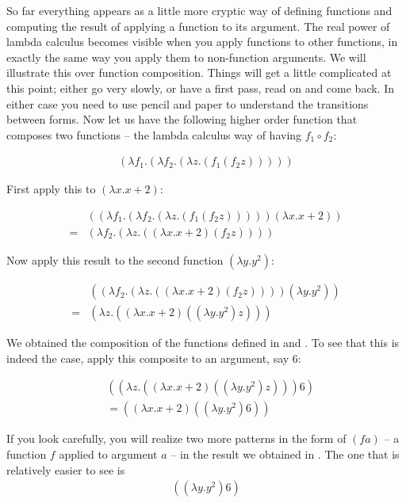 \documentclass[11pt]{article}
\begin{document}
So far everything appears as a little more cryptic way of defining functions and computing the result of applying a function to its argument. The real power of lambda calculus becomes visible when you apply functions to other functions, in exactly the same way you apply them to non-function arguments. We will illustrate this over function composition. Things will get a little complicated at this point; either go very slowly, or have a first pass, read on and come back. In either case you need to use pencil and paper to understand the transitions between forms.  Now let us have the following higher order function that composes two functions -- the lambda calculus way of having $f_1\circ f_2$:

\begin{align}
(\lambda f_1.(\lambda f_2.(\lambda z.(f_1(f_2z)))))
\end{align}

First apply this to $(\lambda x. x + 2)$:

\begin{align}
& ((\lambda f_1.(\lambda f_2.(\lambda z.(f_1(f_2z))))) (\lambda x. x +2))\\
=& (\lambda f_2.(\lambda z.((\lambda x. x +2)(f_2z)))) \nonumber
\end{align}

Now apply this result to the second function $(\lambda y. y^2)$:

\begin{align}
&  ((\lambda f_2.(\lambda z.((\lambda x. x +2)(f_2z))))(\lambda y. y^2)) \\
=& (\lambda z.((\lambda x. x+2)((\lambda y. y^2)z))) \nonumber
\end{align}

We obtained the composition of the functions defined in  and . To see that this is indeed the case, apply this composite to an argument, say 6:

\begin{align}
\label{faint} & ((\lambda z.((\lambda x. x+2)((\lambda y. y^2)z))) 6)\\
&=  ((\lambda x. x+2)((\lambda y. y^2)6))\nonumber 
\end{align}

If you look carefully, you will realize two more patterns in the form of $(f a)$ -- a function $f$ applied to argument $a$ -- in the result we obtained in . The one that is relatively easier to see is  
\begin{align}
\label{occ1} ((\lambda y. y^2)6)
\end{align}
\end{document}
